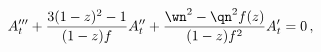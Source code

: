 \begin{equation}
  A_t''' + \frac{3(1-z)^2-1}{(1-z)f} A_t'' + 
  {\wn^2 - \qn^2 f(z)\over  (1-z) f^2} A_t'=0\,,
\label{eq6}
\end{equation}

